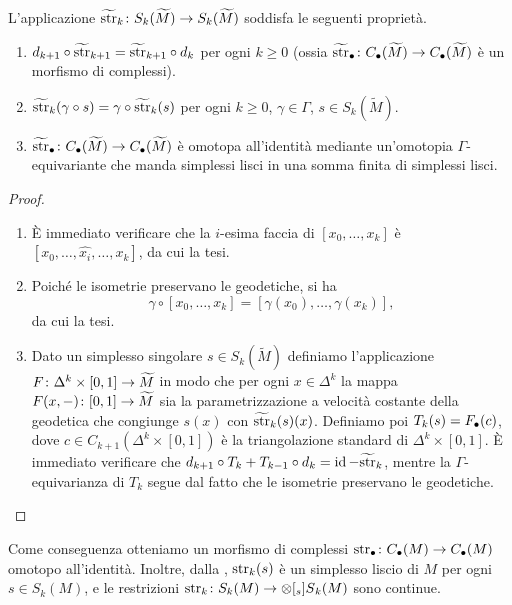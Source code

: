 \begin{proposition}
L'applicazione $\map{\tstr_k}{S_k(\widetilde M)}{S_k(\widetilde M)}$ soddisfa le seguenti proprietà.
\begin{enumerate}
\item $d_{k+1}\circ\widetilde{\operatorname{str}}_{k+1}=\widetilde{\operatorname{str}}_{k+1}\circ d_k$ per ogni $k\ge 0$ (ossia $\map{\tstr_\bul}{C_\bul(\widetilde M)}{C_\bul(\widetilde M)}$ è un morfismo di complessi).
\item $\widetilde{\operatorname{str}}_k(\gamma\circ s)=\gamma\circ\widetilde{\operatorname{str}}_k(s)$ per ogni $k\ge 0$, $\gamma\in\Gamma$, $s\in S_k(\widetilde M)$.
\item $\map{\tstr_\bul}{C_\bul(\widetilde M)}{C_\bul(\widetilde M)}$ è omotopa all'identità mediante un'omotopia $\Gamma$-equivariante che manda simplessi lisci in una somma finita di simplessi lisci.
\end{enumerate}
\end{proposition}
\begin{proof}
\leavevmode
\begin{enumerate}
\item È immediato verificare che la $i$-esima faccia di $[x_0,\ldots,x_k]$ è $[x_0,\ldots,\widehat{x_i},\ldots,x_k]$, da cui la tesi.
\item Poiché le isometrie preservano le geodetiche, si ha
\[
\gamma\circ[x_0,\ldots,x_k]=[\gamma(x_0),\ldots,\gamma(x_k)],
\]
da cui la tesi.
\item Dato un simplesso singolare $s\in S_k(\widetilde M)$ definiamo l'applicazione $\map{F}{\Delta^k\times[0,1]}{\widetilde M}$ in modo che per ogni $x\in\Delta^k$ la mappa $\map{F(x,-)}{[0,1]}{\widetilde M}$ sia la parametrizzazione a velocità costante della geodetica che congiunge $s(x)$ con $\widetilde{\operatorname{str}}_k(s)(x)$. Definiamo poi $T_k(s)=F_\bullet(c)$, dove $c\in C_{k+1}(\Delta^k\times[0,1])$ è la triangolazione standard di $\Delta^k\times[0,1]$. È immediato verificare che $d_{k+1}\circ T_k+T_{k-1}\circ d_k=\operatorname{id}-\widetilde{\operatorname{str}}_k$, mentre la $\Gamma$-equivarianza di $T_k$ segue dal fatto che le isometrie preservano le geodetiche.\qedhere
\end{enumerate}
\end{proof}

Come conseguenza otteniamo un morfismo di complessi $\map{\str_\bul}{C_\bul(M)}{C_\bul(M)}$ omotopo all'identità. Inoltre, dalla , $\operatorname{str}_k(s)$ è un simplesso liscio di $M$ per ogni $s\in S_k(M)$, e le restrizioni $\map{\str_k}{S_k(M)}{\prepost[_s]{S}{_k}(M)}$ sono continue.

